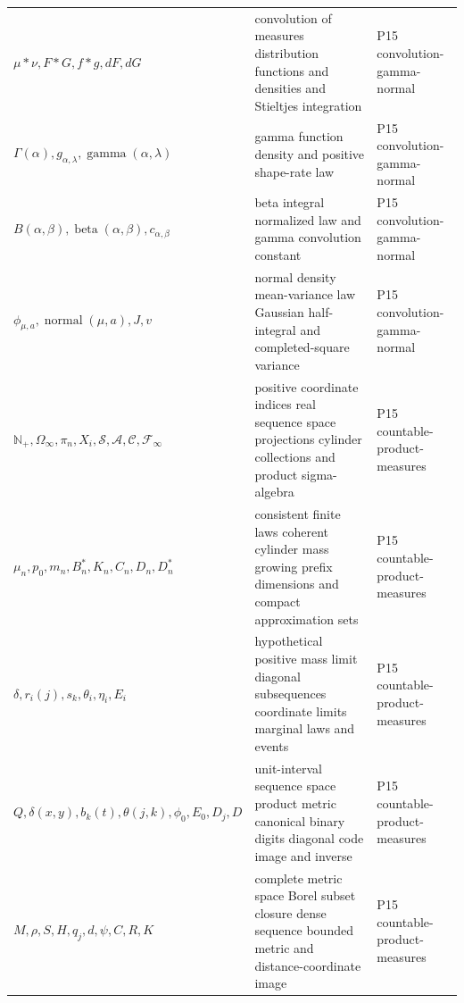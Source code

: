 \begin{longtable}{@{}p{}p{}p{}@{}}
\(\mu*\nu,\allowbreak F*G,\allowbreak f*g,\allowbreak dF,\allowbreak dG\) & convolution of measures distribution functions and densities and Stieltjes integration & P15 convolution-\allowbreak{}gamma-\allowbreak{}normal \\
\(\Gamma(\alpha),\allowbreak g_{\alpha,\lambda},\allowbreak \operatorname{gamma}(\alpha,\allowbreak \lambda)\) & gamma function density and positive shape-rate law & P15 convolution-\allowbreak{}gamma-\allowbreak{}normal \\
\(B(\alpha,\allowbreak \beta),\allowbreak \operatorname{beta}(\alpha,\allowbreak \beta),\allowbreak c_{\alpha,\beta}\) & beta integral normalized law and gamma convolution constant & P15 convolution-\allowbreak{}gamma-\allowbreak{}normal \\
\(\phi_{\mu,a},\allowbreak \operatorname{normal}(\mu,\allowbreak a),\allowbreak J,\allowbreak v\) & normal density mean-variance law Gaussian half-integral and completed-square variance & P15 convolution-\allowbreak{}gamma-\allowbreak{}normal \\
\(\mathbb N_+,\allowbreak \Omega_\infty,\allowbreak \pi_n,\allowbreak X_i,\allowbreak \mathcal S,\allowbreak \mathcal A,\allowbreak \mathcal C,\allowbreak \mathcal F_\infty\) & positive coordinate indices real sequence space projections cylinder collections and product sigma-algebra & P15 countable-\allowbreak{}product-\allowbreak{}measures \\
\(\mu_n,\allowbreak p_0,\allowbreak m_n,\allowbreak B_n^*,\allowbreak K_n,\allowbreak C_n,\allowbreak D_n,\allowbreak D_n^*\) & consistent finite laws coherent cylinder mass growing prefix dimensions and compact approximation sets & P15 countable-\allowbreak{}product-\allowbreak{}measures \\
\(\delta,\allowbreak r_i(j),\allowbreak s_k,\allowbreak \theta_i,\allowbreak \eta_i,\allowbreak E_i\) & hypothetical positive mass limit diagonal subsequences coordinate limits marginal laws and events & P15 countable-\allowbreak{}product-\allowbreak{}measures \\
\(Q,\allowbreak \delta(x,\allowbreak y),\allowbreak b_k(t),\allowbreak \theta(j,\allowbreak k),\allowbreak \phi_0,\allowbreak E_0,\allowbreak D_j,\allowbreak D\) & unit-interval sequence space product metric canonical binary digits diagonal code image and inverse & P15 countable-\allowbreak{}product-\allowbreak{}measures \\
\(M,\allowbreak \rho,\allowbreak S,\allowbreak H,\allowbreak q_j,\allowbreak d,\allowbreak \psi,\allowbreak C,\allowbreak R,\allowbreak K\) & complete metric space Borel subset closure dense sequence bounded metric and distance-coordinate image & P15 countable-\allowbreak{}product-\allowbreak{}measures \\

\end{longtable}
